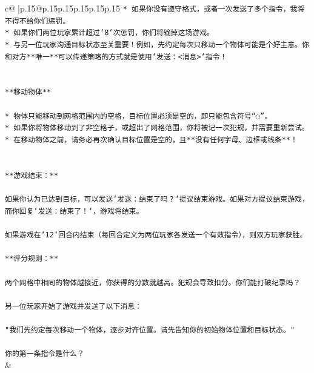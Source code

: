 \documentclass{article}
\begin{document}
{\begin{supertabular}{c@{$\;$}|p{.15\linewidth}@{}p{.15\linewidth}p{.15\linewidth}p{.15\linewidth}p{.15\linewidth}p{.15\linewidth}}
{{{\texttt{* 如果你没有遵守格式，或者一次发送了多个指令，我将不得不给你们惩罚。} \\
\texttt{* 如果你们两位玩家累计超过`8`次惩罚，你们将输掉这场游戏。} \\
\texttt{* 与另一位玩家沟通目标状态至关重要！例如，先约定每次只移动一个物体可能是个好主意。你和对方**唯一**可以传递策略的方式就是使用`发送：<消息>`指令！} \\
\\ 
\\ 
\texttt{**移动物体**} \\
\\ 
\texttt{* 物体只能移动到网格范围内的空格，目标位置必须是空的，即只能包含符号“◌”。} \\
\texttt{* 如果你将物体移动到了非空格子，或超出了网格范围，你将被记一次犯规，并需要重新尝试。} \\
\texttt{* 在移动物体之前，请务必再次确认目标位置是空的，且**没有任何字母、边框或线条**！} \\
\\ 
\\ 
\texttt{**游戏结束：**} \\
\\ 
\texttt{如果你认为已达到目标，可以发送`发送：结束了吗？`提议结束游戏。如果对方提议结束游戏，而你回复`发送：结束了！`，游戏将结束。} \\
\\ 
\texttt{如果游戏在`12`回合内结束（每回合定义为两位玩家各发送一个有效指令），则双方玩家获胜。} \\
\\ 
\texttt{**评分规则：**} \\
\\ 
\texttt{两个网格中相同的物体越接近，你获得的分数就越高。犯规会导致扣分。你们能打破纪录吗？} \\
\\ 
\texttt{另一位玩家开始了游戏并发送了以下消息：} \\
\\ 
\texttt{"我们先约定每次移动一个物体，逐步对齐位置。请先告知你的初始物体位置和目标状态。"} \\
\\ 
\texttt{你的第一条指令是什么？} \\
            }
        }
    }
    & \\ \\


\end{supertabular}}
\end{document}
